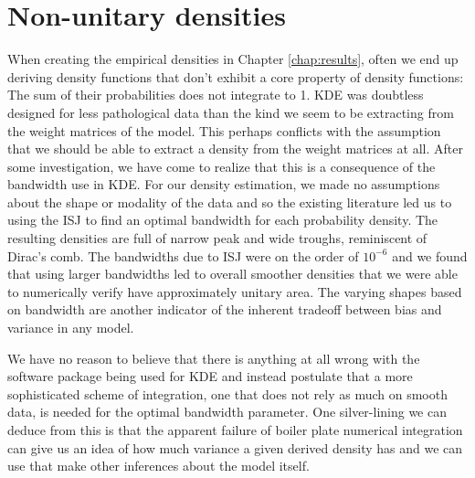 \section{Non-unitary densities}
When creating the empirical densities in Chapter \ref{chap:results}, often we end up deriving 
density functions that don't exhibit a core property of density functions: The sum of their 
probabilities does not integrate to 1. KDE was doubtless designed for less pathological data than 
the kind we seem to be extracting from the weight matrices of the model. This perhaps conflicts with the 
assumption that we should be able to extract a density from the weight matrices at all. After some 
investigation, we have come to realize that this is a consequence of the bandwidth use in KDE. 
For our density estimation, we made no assumptions about the shape or modality of the data and so 
the existing literature led us to using the ISJ to find an optimal bandwidth for each probability
density. The resulting densities are full of narrow peak and wide troughs, reminiscent of Dirac's comb. 
The bandwidths due to ISJ were on the order of $10^{-6}$ and we found that using larger 
bandwidths led to overall smoother densities that we were able to numerically verify have approximately 
unitary area. The varying shapes based on bandwidth are another indicator of the inherent tradeoff 
between bias and variance in any model.

We have no reason to believe that there is anything at all wrong with the software package
being used for KDE and instead postulate that a more sophisticated scheme of integration, one that does not
rely as much on smooth data, is needed for the optimal bandwidth parameter. One silver-lining we can
deduce from this is that the apparent failure of boiler plate numerical integration can give us an idea
of how much variance a given derived density has and we can use that make other inferences about 
the model itself.

